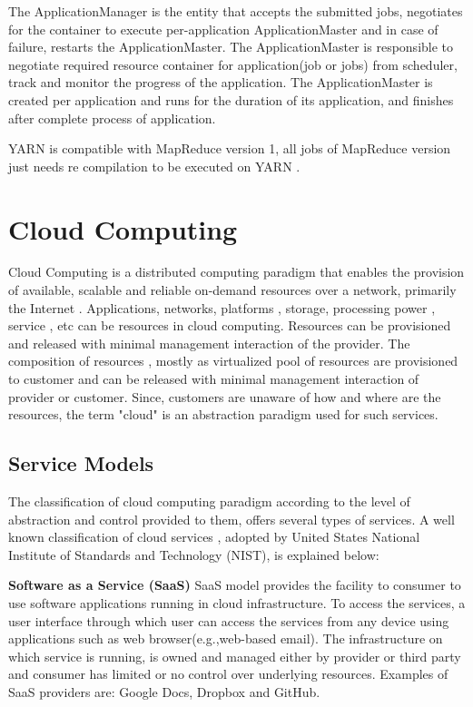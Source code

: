 The ApplicationManager is the entity that accepts the submitted jobs, negotiates for the container to execute per-application ApplicationMaster and in case of failure, restarts the ApplicationMaster. The ApplicationMaster is responsible to negotiate required resource container for application(job or jobs) from scheduler, track and monitor the progress of the application. The ApplicationMaster is created per application and runs for the duration of its application, and finishes after complete process of application.  


YARN‌ is compatible with MapReduce version 1, all jobs of MapReduce version just needs re compilation to be executed on YARN \cite{yarn}.   



  




\section{Cloud Computing}

Cloud Computing is a distributed computing paradigm that enables the provision of available, scalable and reliable on-demand resources over a network, primarily the Internet \cite{nist}. Applications, networks, platforms , storage, processing power , service , etc can be resources in cloud computing. Resources can be provisioned and released with minimal management interaction of the provider. The composition of resources , mostly as virtualized pool of resources are provisioned to customer and can be released with minimal management interaction of provider or customer. Since, customers are unaware of how and where are the resources, the term "cloud" is an abstraction paradigm used for such services. 

\subsection{Service Models}
The classification of cloud computing paradigm according to the level of abstraction and control provided to them, offers several types of services. A well known classification of cloud services , adopted by United States National Institute of Standards and Technology (NIST)‌, is explained below: 


\textbf{Software as a Service (SaaS)} SaaS model provides the facility to consumer to use software applications running in cloud infrastructure. To access the services, a user interface through which user can access the services from any device using applications such as web browser(e.g.,web-based email). The infrastructure on which service is running, is owned and managed either by provider or third party and consumer has limited or no control over underlying resources. Examples of SaaS providers are: Google Docs, Dropbox and GitHub. \\  


